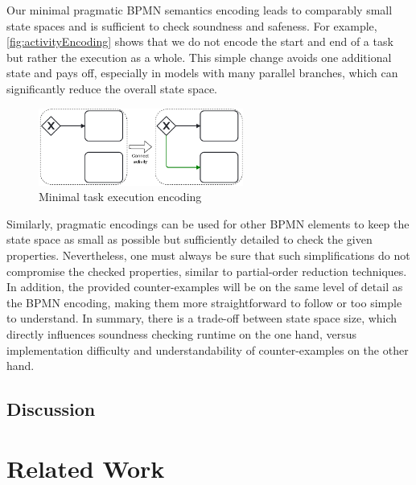 \documentclass[runningheads]{llncs}
\begin{document}
Our minimal pragmatic BPMN semantics encoding leads to comparably small state spaces and is sufficient to check soundness and safeness.
For example, \autoref{fig:activityEncoding} shows that we do not encode the start and end of a task but rather the execution as a whole.
This simple change avoids one additional state and pays off, especially in models with many parallel branches, which can significantly reduce the overall state space.

\begin{figure}[ht]
	\centering
	\includegraphics[width=0.6\textwidth]{images/dead}
	\caption{Minimal task execution encoding}
	\label{fig:activityEncoding}
\end{figure}

Similarly, pragmatic encodings can be used for other BPMN elements to keep the state space as small as possible but sufficiently detailed to check the given properties.
Nevertheless, one must always be sure that such simplifications do not compromise the checked properties, similar to partial-order reduction techniques.
In addition, the provided counter-examples will be on the same level of detail as the BPMN encoding, making them more straightforward to follow or too simple to understand.
In summary, there is a trade-off between state space size, which directly influences soundness checking runtime on the one hand, versus implementation difficulty and understandability of counter-examples on the other hand.

\subsection{Discussion}

\section{Related Work}
\end{document}
